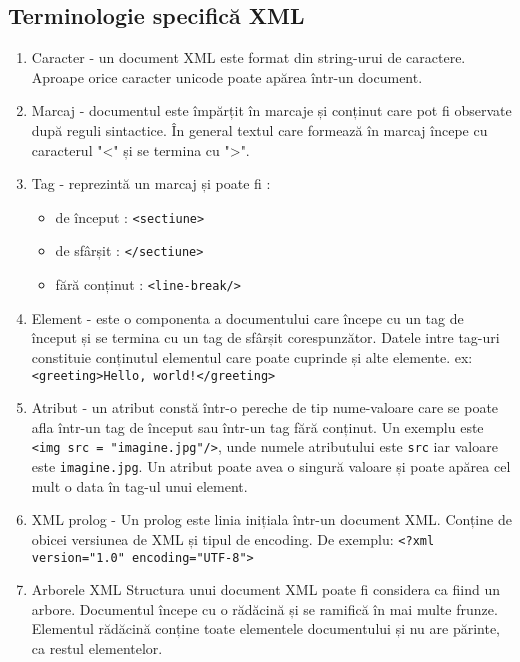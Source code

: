 \subsection{Terminologie specifică XML}

\begin{enumerate}[wide=0pt, listparindent=1.25em, parsep=0pt]
    \item Caracter - un document XML este format din string-urui de caractere. Aproape orice caracter unicode poate apărea într-un document.
    \item Marcaj - documentul este împărțit în marcaje și conținut care pot fi observate după reguli sintactice. În general textul care formează în marcaj începe cu caracterul "<" și se termina cu ">". 
    \item Tag - reprezintă un marcaj și poate fi :
    \begin{itemize}
        \item de început : \verb|<sectiune>|
        \item de sfârșit : \verb|</sectiune>|
        \item fără conținut : \verb|<line-break/>|
    \end{itemize}
    \item Element - este o componenta a documentului care începe cu un tag de început și se termina cu un tag de 
    sfârșit corespunzător. Datele intre tag-uri constituie conținutul elementul care poate cuprinde și alte elemente.\newline 
    ex: \verb|<greeting>Hello, world!</greeting>|
    \item Atribut - un atribut constă într-o pereche de tip nume-valoare care se poate afla într-un tag de început sau 
    într-un tag fără conținut.\newline 
    Un exemplu este \verb|<img src = "imagine.jpg"/>|, unde numele atributului este \verb|src| iar valoare 
    este \verb|imagine.jpg|. Un atribut poate avea o singură valoare și poate apărea cel mult o data în tag-ul unui element. 
    \item XML prolog - Un prolog este linia inițiala într-un document XML. Conține de obicei versiunea de XML și tipul de encoding.\newline 
    De exemplu: \verb|<?xml version="1.0" encoding="UTF-8">|
    \item Arborele XML Structura unui document XML poate fi considera ca fiind un arbore. 
    Documentul începe cu o rădăcină și se ramifică în mai multe frunze. 
    Elementul rădăcină conține toate elementele documentului și nu are părinte, ca restul elementelor.
\end{enumerate} 

